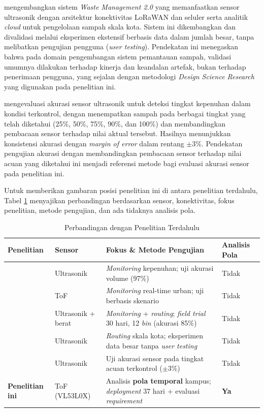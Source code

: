 \textcite{addas2024waste} mengembangkan sistem \textit{Waste Management 2.0} yang memanfaatkan sensor ultrasonik dengan arsitektur konektivitas LoRaWAN dan seluler serta analitik \textit{cloud} untuk pengelolaan sampah skala kota. Sistem ini dikembangkan dan divalidasi melalui eksperimen ekstensif berbasis data dalam jumlah besar, tanpa melibatkan pengujian pengguna (\textit{user testing}). Pendekatan ini menegaskan bahwa pada domain pengembangan sistem pemantauan sampah, validasi umumnya dilakukan terhadap kinerja dan keandalan artefak, bukan terhadap penerimaan pengguna, yang sejalan dengan metodologi \textit{Design Science Research} yang digunakan pada penelitian ini.

\textcite{swe2025sustainability} mengevaluasi akurasi sensor ultrasonik untuk deteksi tingkat kepenuhan dalam kondisi terkontrol, dengan menempatkan sampah pada berbagai tingkat yang telah diketahui (25\%, 50\%, 75\%, 90\%, dan 100\%) dan membandingkan pembacaan sensor terhadap nilai aktual tersebut. Hasilnya menunjukkan konsistensi akurasi dengan \textit{margin of error} dalam rentang $\pm$3\%. Pendekatan pengujian akurasi dengan membandingkan pembacaan sensor terhadap nilai acuan yang diketahui ini menjadi referensi metode bagi evaluasi akurasi sensor pada penelitian ini.

Untuk memberikan gambaran posisi penelitian ini di antara penelitian terdahulu, Tabel \ref{tab:perbandingan-penelitian} menyajikan perbandingan berdasarkan sensor, konektivitas, fokus penelitian, metode pengujian, dan ada tidaknya analisis pola.

\begin{table}[H]
  \caption{Perbandingan dengan Penelitian Terdahulu}
  \label{tab:perbandingan-penelitian}
  \footnotesize
  \begin{tabularx}{\textwidth}{| l | l | X | l |}
    \hline
    \textbf{Penelitian} & \textbf{Sensor} & \textbf{Fokus \& Metode Pengujian} & \textbf{Analisis Pola} \\
    \hline
    \textcite{latifah2021} & Ultrasonik & \textit{Monitoring} kepenuhan; uji akurasi volume (97\%) & Tidak \\
    \hline
    \textcite{pires2025} & ToF & \textit{Monitoring} real-time urban; uji berbasis skenario & Tidak \\
    \hline
    \textcite{iotsmartwaste2025urban} & Ultrasonik + berat & \textit{Monitoring} + \textit{routing}; \textit{field trial} 30 hari, 12 \textit{bin} (akurasi 85\%) & Tidak \\
    \hline
    \textcite{addas2024waste} & Ultrasonik & \textit{Routing} skala kota; eksperimen data besar tanpa \textit{user testing} & Tidak \\
    \hline
    \textcite{swe2025sustainability} & Ultrasonik & Uji akurasi sensor pada tingkat acuan terkontrol ($\pm$3\%) & Tidak \\
    \hline
    \textbf{Penelitian ini} & ToF (VL53L0X) & Analisis \textbf{pola temporal} kampus; \textit{deployment} 37 hari + evaluasi \textit{requirement} & \textbf{Ya} \\
    \hline
  \end{tabularx}
\end{table}

